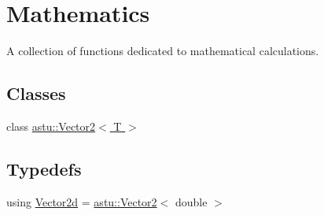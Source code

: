 \hypertarget{group__math__group}{}\section{Mathematics}
\label{group__math__group}


A collection of functions dedicated to mathematical calculations.  


\subsection*{Classes}
\begin{DoxyCompactItemize}
\item 
class \hyperlink{classastu_1_1Vector2}{astu\+::\+Vector2$<$ T $>$}
\end{DoxyCompactItemize}
\subsection*{Typedefs}
\begin{DoxyCompactItemize}
\item 
using \hyperlink{group__math__group_ga04b5b280f94e1b680b1c831c1df168bd}{Vector2d} = \hyperlink{classastu_1_1Vector2}{astu\+::\+Vector2}$<$ double $>$
\end{DoxyCompactItemize}
